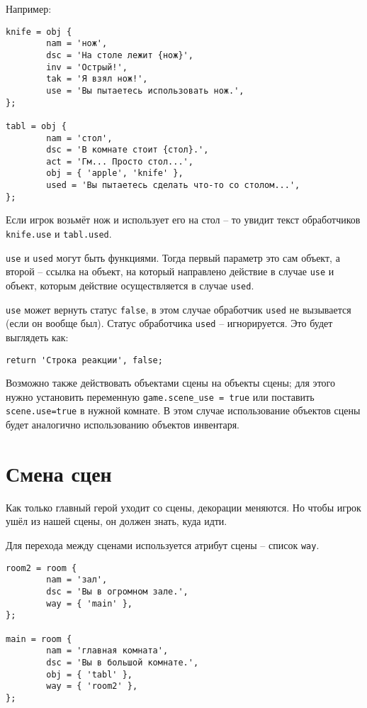 \documentclass[a4paper,12pt]{article}
\begin{document}
Например:

\begin{verbatim}
knife = obj {
        nam = 'нож',
        dsc = 'На столе лежит {нож}',
        inv = 'Острый!',
        tak = 'Я взял нож!',
        use = 'Вы пытаетесь использовать нож.',
};

tabl = obj {
        nam = 'стол',
        dsc = 'В комнате стоит {стол}.',
        act = 'Гм... Просто стол...',
        obj = { 'apple', 'knife' },
        used = 'Вы пытаетесь сделать что-то со столом...',
};
\end{verbatim}

Если игрок возьмёт нож и использует его на стол -- то увидит текст обработчиков \verb/knife.use/ и \verb/tabl.used/.

\verb/use/ и \verb/used/ могут быть функциями. Тогда первый параметр это сам объект, а второй -- ссылка на объект, на который направлено действие в случае \verb/use/ и объект, которым действие осуществляется в случае \verb/used/.

\verb/use/ может вернуть статус \verb/false/, в этом случае обработчик \verb/used/ не вызывается (если он вообще был). Статус обработчика \verb/used/ -- игнорируется. Это будет выглядеть как:

\begin{verbatim}
return 'Строка реакции', false;
\end{verbatim}

Возможно также действовать объектами сцены на объекты сцены; для этого нужно установить переменную \verb/game.scene_use = true/ или поставить \verb/scene.use=true/ в нужной комнате. В этом случае использование объектов сцены будет аналогично использованию объектов инвентаря.

\section{Смена сцен}

Как только главный герой уходит со сцены, декорации меняются. Но чтобы игрок ушёл из нашей сцены, он должен знать, куда идти.

Для перехода между сценами используется атрибут сцены -- список \verb/way/.

\begin{verbatim}
room2 = room {
        nam = 'зал',
        dsc = 'Вы в огромном зале.',
        way = { 'main' },
};

main = room {
        nam = 'главная комната',
        dsc = 'Вы в большой комнате.',
        obj = { 'tabl' },
        way = { 'room2' },
};
\end{verbatim}
\end{document}

